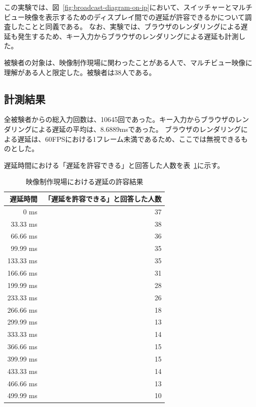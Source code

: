 この実験では、図~\ref{fig:broadcast-diagram-on-ip}において、スイッチャーとマルチビュー映像を表示するためのディスプレイ間での遅延が許容できるかについて調査したことと同義である。
なお、実験では、ブラウザのレンダリングによる遅延も発生するため、キー入力からブラウザのレンダリングによる遅延も計測した。

被験者の対象は、映像制作現場に関わったことがある人で、マルチビュー映像に理解がある人と限定した。被験者は38人である。

\newpage
\subsection{計測結果}

全被験者からの総入力回数は、10645回であった。キー入力からブラウザのレンダリングによる遅延の平均は、8.6889msであった。
ブラウザのレンダリングによる遅延は、60FPSにおける1フレーム未満であるため、ここでは無視できるものとした。

遅延時間における「遅延を許容できる」と回答した人数を表~\ref{tb:mv-delay-result}に示す。

\begin{table}[htbp]
  \caption{映像制作現場における遅延の許容結果}
  \label{tb:mv-delay-result}
  \begin{center}
  \begin{tabular}{r|r}
    \hline
    遅延時間   & 「遅延を許容できる」と回答した人数 \\\hline\hline
    0 ms      & 37 \\\hline
    33.33 ms  & 38 \\\hline
    66.66 ms  & 36 \\\hline
    99.99 ms  & 35 \\\hline
    133.33 ms & 35 \\\hline
    166.66 ms & 31 \\\hline
    199.99 ms & 28 \\\hline
    233.33 ms & 26 \\\hline
    266.66 ms & 18 \\\hline
    299.99 ms & 13 \\\hline
    333.33 ms & 14 \\\hline
    366.66 ms & 15 \\\hline
    399.99 ms & 15 \\\hline
    433.33 ms & 14 \\\hline
    466.66 ms & 13 \\\hline
    499.99 ms & 10 \\\hline
  \end{tabular}\end{center}
\end{table}

